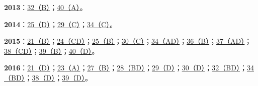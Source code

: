 \documentclass[11pt,a4paper]{article}
\begin{document}
\noindent\textbf{2013}：\hyperref[idx-2013-T3-Q32]{32（B）}；\hyperref[idx-2013-T4-Q40]{40（A）}。\par
\noindent\textbf{2014}：\hyperref[idx-2014-T1-Q25]{25（D）}；\hyperref[idx-2014-T2-Q29]{29（C）}；\hyperref[idx-2014-T3-Q34]{34（C）}。\par
\noindent\textbf{2015}：\hyperref[idx-2015-T1-Q21]{21（B）}；\hyperref[idx-2015-T1-Q24]{24（CD）}；\hyperref[idx-2015-T1-Q25]{25（B）}；\hyperref[idx-2015-T2-Q30]{30（C）}；\hyperref[idx-2015-T3-Q34]{34（AD）}；\hyperref[idx-2015-T4-Q36]{36（B）}；\hyperref[idx-2015-T4-Q37]{37（AD）}；\hyperref[idx-2015-T4-Q38]{38（CD）}；\hyperref[idx-2015-T4-Q39]{39（B）}；\hyperref[idx-2015-T4-Q40]{40（D）}。\par
\noindent\textbf{2016}：\hyperref[idx-2016-T1-Q21]{21（D）}；\hyperref[idx-2016-T1-Q23]{23（A）}；\hyperref[idx-2016-T2-Q27]{27（B）}；\hyperref[idx-2016-T2-Q28]{28（BD）}；\hyperref[idx-2016-T2-Q29]{29（D）}；\hyperref[idx-2016-T2-Q30]{30（D）}；\hyperref[idx-2016-T3-Q32]{32（BD）}；\hyperref[idx-2016-T3-Q34]{34（BD）}；\hyperref[idx-2016-T4-Q38]{38（D）}；\hyperref[idx-2016-T4-Q39]{39（D）}。\par
{}
\end{document}
